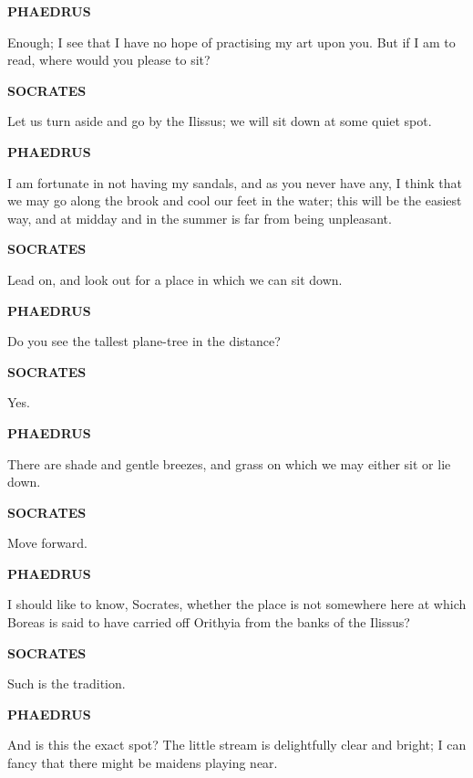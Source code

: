 \documentclass[11pt,letter]{article}
\begin{document}
\par \textbf{PHAEDRUS}
\par   Enough; I see that I have no hope of practising my art upon you. But if I am to read, where would you please to sit?

\par \textbf{SOCRATES}
\par   Let us turn aside and go by the Ilissus; we will sit down at some quiet spot.

\par \textbf{PHAEDRUS}
\par   I am fortunate in not having my sandals, and as you never have any, I think that we may go along the brook and cool our feet in the water; this will be the easiest way, and at midday and in the summer is far from being unpleasant.

\par \textbf{SOCRATES}
\par   Lead on, and look out for a place in which we can sit down.

\par \textbf{PHAEDRUS}
\par   Do you see the tallest plane-tree in the distance?

\par \textbf{SOCRATES}
\par   Yes.

\par \textbf{PHAEDRUS}
\par   There are shade and gentle breezes, and grass on which we may either sit or lie down.

\par \textbf{SOCRATES}
\par   Move forward.

\par \textbf{PHAEDRUS}
\par   I should like to know, Socrates, whether the place is not somewhere here at which Boreas is said to have carried off Orithyia from the banks of the Ilissus?

\par \textbf{SOCRATES}
\par   Such is the tradition.

\par \textbf{PHAEDRUS}
\par   And is this the exact spot? The little stream is delightfully clear and bright; I can fancy that there might be maidens playing near.
\end{document}
